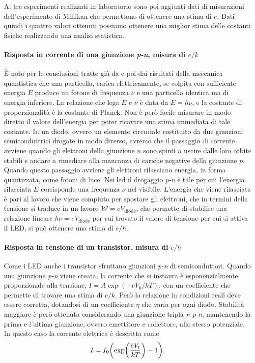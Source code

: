 \documentclass[a4paper, varvw, nofootinbib]{revtex4-2}
\begin{document}
Ai tre esperimenti realizzati in laboratorio sono poi aggiunti dati di misurazioni dell'esperimento di Millikan che permettono di ottenere una stima di $e$. Dati quindi i quattro valori ottenuti possiamo ottenere una miglior stima delle costanti fisiche realizzando una analisi statistica.

\paragraph*{Risposta in corrente di una giunzione \emph{p-n}, misura di $e/k$}

È noto per le conclusioni tratte già da \cite{einsteinConcerningHeuristicPoint1965} e poi dai risultati della meccanica quantistica che una particella, carica elettricamente, se colpita con sufficiente energia $E$ produce un fotone di frequenza $\nu$ e una particella identica ma di energia inferiore. La relazione che lega $E$ e $\nu$ è data da $E=h\nu$, e la costante di proporzionalità è la costante di Planck. Non è però facile misurare in modo diretto il valore dell'energia per poter ricavare una stima immediata di tale costante. In un diodo, ovvero un elemento circuitale costituito da due giunzioni semiconduttrici drogate in modo diverso, avremo che il passaggio di corrente avviene quando gli elettroni della giunzione $n$ sono spinti a uscire dalle loro orbite stabili e andare a rimediare alla mancanza di cariche negative della giunzione $p$. Quando questo passaggio avviene gli elettroni rilasciano energia, in forma quantizzata, come fotoni di luce. Nei led il drogaggio \emph{p-n} è tale per cui l'energia rilasciata $E$ corrisponde una frequenza $\nu$ nel visibile. L'energia che viene rilasciata è pari al lavoro che viene compiuto per spostare gli elettroni, che in termini della tensione si traduce in un lavoro $\mathcal W = e V_\text{diode}$, che permette di stabilire una relazione lineare $h\nu = eV_\text{diode}$ per cui trovato il valore di tensione per cui si attiva il LED, si può ottenere una stima di $e/h$.

\paragraph*{Risposta in tensione di un transistor, misura di $e/h$}

Come i LED anche i transistor sfruttano giunzioni \emph{p-n} di semiconduttori. Quando una giunzione \emph{p-n} viene creata, la corrente che si instaura è esponenzialmente proporzionale alla tensione, $I=A\exp(-eV_0/kT)$, con un coefficiente che permette di trovare una stima di $e/k$. Però la relazione in condizioni reali deve essere corretta, dotandosi di un coefficiente $\eta$ che varia per ogni diodo. Stabilità maggiore è però ottenuta considerando una giunzione tripla \emph{n-p-n}, mantenendo la prima e l'ultima giunzione, ovvero emettitore e collettore, allo stesso potenziale. In questo caso la corrente elettrica è descritta come \begin{equation} I = I_0 \qty(\exp(\frac{eV_{t}}{kT}) - 1). \end{equation}
\end{document}
